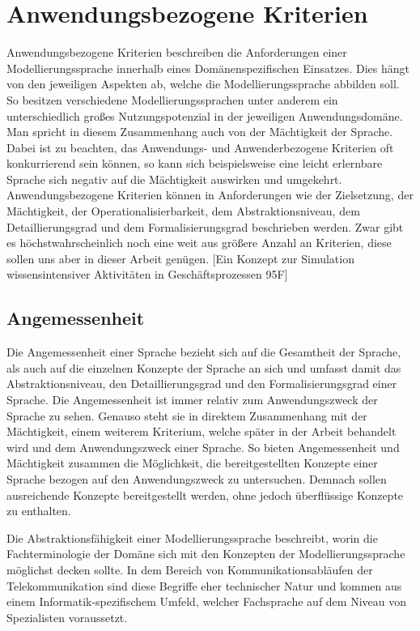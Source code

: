 \section{Anwendungsbezogene Kriterien}
\label{sc:AnwendungsbezogeneKriterien}
Anwendungsbezogene Kriterien beschreiben die Anforderungen einer Modellierungssprache innerhalb eines Domänenspezifischen Einsatzes.
Dies hängt von den jeweiligen Aspekten ab, welche die Modellierungssprache abbilden soll.
So besitzen verschiedene Modellierungssprachen unter anderem ein unterschiedlich großes Nutzungspotenzial in der jeweiligen Anwendungsdomäne.
Man spricht in diesem Zusammenhang auch von der Mächtigkeit der Sprache.
Dabei ist zu beachten, das Anwendungs- und Anwenderbezogene Kriterien oft konkurrierend sein können,
so kann sich beispielsweise eine leicht erlernbare Sprache sich negativ auf die Mächtigkeit auswirken und umgekehrt.
Anwendungsbezogene Kriterien können in Anforderungen wie der Zielsetzung, der Mächtigkeit, der Operationalisierbarkeit,
dem Abstraktionsniveau, dem Detaillierungsgrad und dem Formalisierungsgrad beschrieben werden.
Zwar gibt es höchstwahrscheinlich noch eine weit aus größere Anzahl an Kriterien, diese sollen uns aber in dieser Arbeit genügen.  
[Ein Konzept zur Simulation wissensintensiver Aktivitäten in Geschäftsprozessen 95F]

\subsection{Angemessenheit}
\label{ssc:Angemessenheit}
Die Angemessenheit einer Sprache bezieht sich auf die Gesamtheit der Sprache,
als auch auf die einzelnen Konzepte der Sprache an sich und umfasst damit das Abstraktionsniveau, den Detaillierungsgrad und den Formalisierungsgrad einer Sprache.
Die Angemessenheit ist immer relativ zum Anwendungszweck der Sprache zu sehen.
Genauso steht sie in direktem Zusammenhang mit der Mächtigkeit, einem weiterem Kriterium, welche später in der Arbeit behandelt wird und dem Anwendungszweck einer Sprache. 
So bieten Angemessenheit und Mächtigkeit zusammen die Möglichkeit, die bereitgestellten Konzepte einer Sprache bezogen auf den Anwendungszweck zu untersuchen. Demnach sollen ausreichende Konzepte bereitgestellt werden, ohne jedoch überflüssige Konzepte zu enthalten.

Die Abstraktionsfähigkeit einer Modellierungssprache beschreibt, worin die Fachterminologie der Domäne sich mit den Konzepten der Modellierungssprache möglichst decken sollte. In dem Bereich von Kommunikationsabläufen der Telekommunikation sind diese Begriffe eher technischer Natur und kommen aus einem Informatik-spezifischem Umfeld, welcher Fachsprache auf dem Niveau von Spezialisten voraussetzt. 

